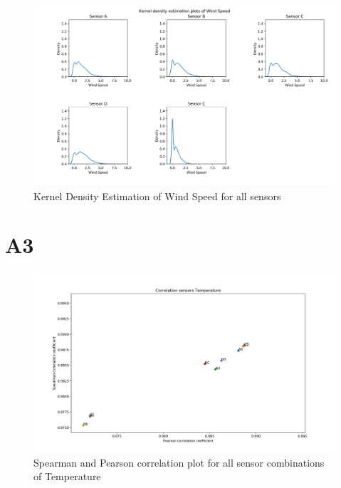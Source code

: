 \documentclass{article}
\begin{document}
            \begin{figure}[H]
                \includegraphics[width=\textwidth]{kde_windspeed}
                \caption{Kernel Density Estimation of Wind Speed for all sensors}
            \end{figure}



\section{A3}
    \begin{figure}[H]
        \includegraphics[width=\textwidth]{cor_temp}
        \caption{Spearman and Pearson correlation plot for all sensor combinations of Temperature}
    \end{figure}
\end{document}
